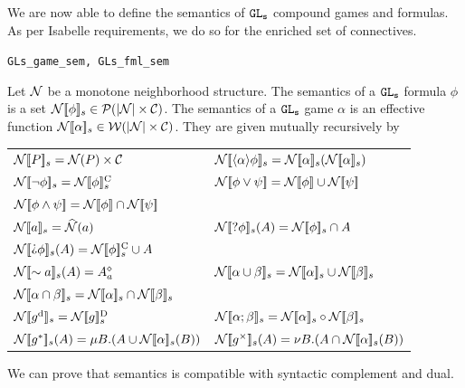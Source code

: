 We are now able to define the semantics of $\texttt{GL\textsubscript{s}}$ compound games and formulas. As per Isabelle requirements, we do so for the enriched set of connectives.

\begin{bdefinition}
\texttt{GLs\_game\_sem, GLs\_fml\_sem}

    Let $\mathcal N$ be a monotone neighborhood structure. The semantics of a $\texttt{GL\textsubscript{s}}$ formula $\phi$ is a set $\mathcal N[\![ \phi ]\!]_s\in \mathcal P (|\mathcal N|\times \mathcal C)$. The semantics of a $\texttt{GL\textsubscript{s}}$ game $\alpha$ is an effective function $\mathcal N[\![\alpha]\!]_s\in \mathcal W(|\mathcal N|\times \mathcal C)$. They are given mutually recursively by
    
    \begin{tabular}{l l}
        $\mathcal N[\![ P]\!]_s = \mathcal N(P)\times \mathcal C$ 
        & $\mathcal N[\![ \langle\alpha\rangle\phi]\!]_s = \mathcal N[\![\alpha]\!]_s(\mathcal N[\![\alpha]\!]_s)$ \\
        $\mathcal N[\![ \neg\phi]\!]_s = \mathcal N[\![ \phi]\!]_s^\text{C}$ 
        & $\mathcal N[\![ \phi\vee\psi]\!]=\mathcal N[\![\phi]\!]\cup \mathcal N[\![\psi]\!]$ \\
        $\mathcal N[\![ \phi\wedge\psi]\!]=\mathcal N[\![\phi]\!]\cap \mathcal N[\![\psi]\!]$ \\
        $\mathcal N[\![ a]\!]_s=\widehat{\mathcal N}(a)$ 
        & $\mathcal N[\![ \text{?}\phi]\!]_s(A)=\mathcal N[\![ \phi]\!]_s\cap A$ \\
        $\N\ddl \DTest\phi\ddr_s(A)=\sabocomp{\N\ddl \phi\ddr_s}\cup A$ \\
        $\mathcal N[\![ \sim a]\!]_s(A)= A^\diamond_a$ 
        & $\mathcal N[\![ \alpha\cup\beta]\!]_s=\mathcal N[\![ \alpha]\!]_s \cup \mathcal N[\![ \beta]\!]_s$ \\
        $\mathcal N[\![ \alpha\cap\beta]\!]_s=\mathcal N[\![ \alpha]\!]_s \cap \mathcal N[\![ \beta]\!]_s$ \\
        $\mathcal N[\![g^\text{d}]\!]_s=\mathcal N[\![ g]\!]_s^\text{D}$ 
        & $\mathcal N[\![\alpha;\beta]\!]_s=\mathcal N[\![ \alpha]\!]_s\circ \mathcal N[\![\beta]\!]_s$ \\
        $\mathcal N[\![ g^*]\!]_s(A)=\mu B.(A\cup \mathcal N[\![ \alpha]\!]_s(B))$ 
        & $\mathcal N[\![ g^\times]\!]_s(A)=\nu B.(A\cap \mathcal N[\![ \alpha]\!]_s(B))$ \\
        
    \end{tabular}

\end{bdefinition}

We can prove that \GLs{} semantics is compatible with syntactic complement and dual. 

